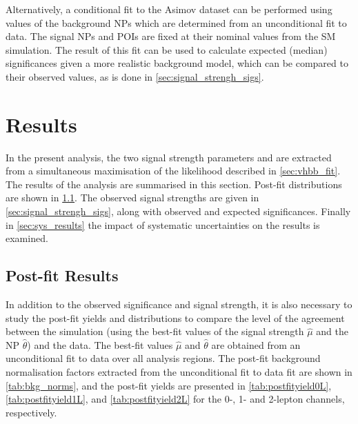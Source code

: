 Alternatively, a conditional fit to the Asimov dataset can be performed using values of the background NPs which are determined from an unconditional fit to data.
The signal NPs and POIs are fixed at their nominal values from the SM simulation.
The result of this fit can be used to calculate expected (median) significances given a more realistic background model, which can be compared to their observed values, as is done in \cref{sec:signal_strengh_sigs}.

\section{Results}\label{sec:vhbb_results}

In the present analysis, the two signal strength parameters \muVH and \muVZ are extracted from a simultaneous maximisation of the likelihood described in \cref{sec:vhbb_fit}.
The results of the analysis are summarised in this section.
Post-fit \mJ distributions are shown in \cref{sec:postfit_plots}.
The observed signal strengths are given in \cref{sec:signal_strengh_sigs}, along with observed and expected significances.
Finally in \cref{sec:sys_results} the impact of systematic uncertainties on the results is examined.



\subsection{Post-fit Results}\label{sec:postfit_plots}

In addition to the observed significance and signal strength, it is also necessary to study the post-fit \mJ yields and  distributions to compare the level of the agreement between the simulation (using the best-fit values of the signal strength $\hat{\mu}$ and the NP $\hat{\theta}$) and the data.
The best-fit values $\hat{\mu}$ and $\hat{\theta}$ are obtained from an unconditional fit to data over all analysis regions.
The post-fit background normalisation factors extracted from the unconditional fit to data fit are shown in \cref{tab:bkg_norms}, and the post-fit yields are presented in \cref{tab:postfityield0L}, \cref{tab:postfityield1L}, and \cref{tab:postfityield2L} for the 0-, 1- and 2-lepton channels, respectively.





